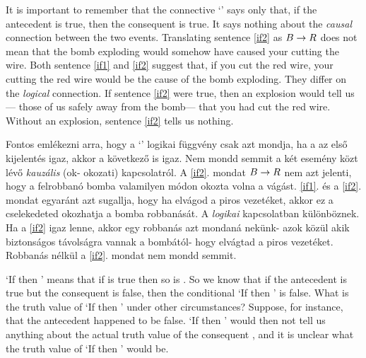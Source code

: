 It is important to remember that the connective `\eif' says only that, if the antecedent is true, then the consequent is true. It says nothing about the \emph{causal} connection between the two events. Translating sentence \ref{if2} as $B \rightarrow R$ does not mean that the bomb exploding would somehow have caused your cutting the wire. Both sentence \ref{if1} and \ref{if2} suggest that, if you cut the red wire, your cutting the red wire would be the cause of the bomb exploding. They differ on the \emph{logical} connection. If sentence \ref{if2} were true, then an explosion would tell us--- those of us safely away from the bomb--- that you had cut the red wire. Without an explosion, sentence \ref{if2} tells us nothing.

Fontos emlékezni arra, hogy a `\eif'  logikai függvény csak azt mondja, ha a
az első kijelentés igaz, akkor a következő is igaz.
Nem mondd semmit a két esemény közt lévő \emph{kauzális} (ok- okozati) kapcsolatról.
A \ref{if2}. mondat $B \rightarrow R$ nem azt jelenti, hogy a felrobbanó bomba valamilyen módon okozta volna a vágást. \ref{if1}. és a \ref{if2}. mondat egyaránt azt sugallja, hogy ha elvágod a piros vezetéket, akkor ez a cselekedeted okozhatja a bomba robbanását.
A \emph{logikai} kapcsolatban különböznek.  Ha a \ref{if2} igaz lenne, akkor egy robbanás azt mondaná
nekünk- azok közül akik biztonságos távolságra vannak a bombától- hogy elvágtad a piros
vezetéket. Robbanás nélkül a \ref{if2}. mondat nem mondd semmit.




`If  then ' means that if  is true then so is . So we know that if the antecedent  is true but the consequent  is false, then the conditional `If  then ' is false. What is the truth value of `If  then ' under other circumstances? Suppose, for instance, that the antecedent  happened to be false. `If  then ' would then not tell us anything about the actual truth value of the consequent , and it is unclear what the truth value of `If  then ' would be.

